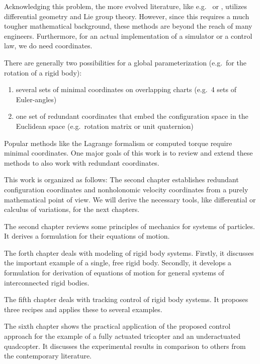 Acknowledging this problem, the more evolved literature, like e.g.\ \cite{Marsden:MechanicsAndSymmetry} or \cite{Bullo:GeometricControl}, utilizes differential geometry and Lie group theory.
However, since this requires a much tougher mathematical background, these methods are beyond the reach of many engineers.
Furthermore, for an actual implementation of a simulator or a control law, we do need coordinates.

There are generally two possibilities for a global parameterization (e.g.\ for the rotation of a rigid body):
\begin{enumerate}
 \item several sets of minimal coordinates on overlapping charts (e.g.\ 4 sets of Euler-angles)
 \item one set of redundant coordinates that embed the configuration space in the Euclidean space (e.g.\ rotation matrix or unit quaternion)
\end{enumerate}
Popular methods like the Lagrange formalism or computed torque require minimal coordinates.
One major goals of this work is to review and extend these methods to also work with redundant coordinates.



This work is organized as follows:
The second chapter establishes redundant configuration coordinates and nonholonomic velocity coordinates from a purely mathematical point of view.
We will derive the necessary tools, like differential or calculus of variations, for the next chapters.

The second chapter reviews some principles of mechanics for systems of particles.
It derives a formulation for their equations of motion.

The forth chapter deals with modeling of rigid body systems.
Firstly, it discusses the important example of a single, free rigid body.
Secondly, it develops a formulation for derivation of equations of motion for general systems of interconnected rigid bodies.

The fifth chapter deals with tracking control of rigid body systems.
It proposes three recipes and applies these to several examples.

The sixth chapter shows the practical application of the proposed control approach for the example of a fully actuated tricopter and an underactuated quadcopter.
It discusses the experimental results in comparison to others from the contemporary literature.

